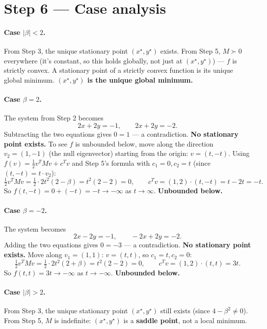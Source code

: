 \documentclass[11pt]{article}
\begin{document}
\section*{Step 6 --- Case analysis}

\paragraph{Case $|\beta|<2$.} From Step 3, the unique stationary point $(x^\star,y^\star)$ exists. From Step 5, $M\succ0$ everywhere (it's constant, so this holds globally, not just at $(x^\star,y^\star)$) --- $f$ is strictly convex. A stationary point of a strictly convex function is its unique global minimum. \textbf{$(x^\star,y^\star)$ is the unique global minimum.}

\paragraph{Case $\beta=2$.} The system from Step 2 becomes
\[
2x+2y=-1, \qquad 2x+2y=-2.
\]
Subtracting the two equations gives $0=1$ --- a contradiction. \textbf{No stationary point exists.} To see $f$ is unbounded below, move along the direction $v_2=(1,-1)$ (the null eigenvector) starting from the origin: $v=(t,-t)$. Using $f(v)=\tfrac12v^TMv+c^Tv$ and Step 5's formula with $c_1=0,c_2=t$ (since $(t,-t)=t\cdot v_2$):
\[
\tfrac12v^TMv = \tfrac12\cdot 2t^2(2-\beta) = t^2(2-2) = 0, \qquad c^Tv = (1,2)\cdot(t,-t) = t-2t=-t.
\]
So $f(t,-t) = 0 + (-t) = -t \to -\infty$ as $t\to\infty$. \textbf{Unbounded below.}

\paragraph{Case $\beta=-2$.} The system becomes
\[
2x-2y=-1, \qquad -2x+2y=-2.
\]
Adding the two equations gives $0=-3$ --- a contradiction. \textbf{No stationary point exists.} Move along $v_1=(1,1)$: $v=(t,t)$, so $c_1=t,c_2=0$:
\[
\tfrac12v^TMv = \tfrac12\cdot 2t^2(2+\beta) = t^2(2-2)=0, \qquad c^Tv=(1,2)\cdot(t,t)=3t.
\]
So $f(t,t) = 3t \to -\infty$ as $t\to-\infty$. \textbf{Unbounded below.}

\paragraph{Case $|\beta|>2$.} From Step 3, the unique stationary point $(x^\star,y^\star)$ still exists (since $4-\beta^2\ne0$). From Step 5, $M$ is indefinite: $(x^\star,y^\star)$ is a \textbf{saddle point}, not a local minimum.
\end{document}

